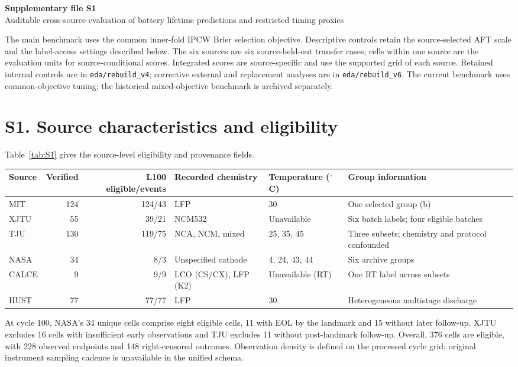 \documentclass[10pt,a4paper]{article}
\begin{document}
\raggedright
\begin{center}
{\Large\bfseries Supplementary file S1}\\[4pt]
Auditable cross-source evaluation of battery lifetime predictions and restricted timing proxies
\end{center}

The main benchmark uses the common inner-fold IPCW Brier selection objective. Descriptive controls retain the source-selected AFT scale and the label-access settings described below. The six sources are six source-held-out transfer cases; cells within one source are the evaluation units for source-conditional scores. Integrated scores are source-specific and use the supported grid of each source. Retained internal controls are in \texttt{eda/rebuild\_v4}; corrective external and replacement analyses are in \texttt{eda/rebuild\_v6}. The current benchmark uses common-objective tuning; the historical mixed-objective benchmark is archived separately.

\section*{S1. Source characteristics and eligibility}
Table~\ref{tab:S1} gives the source-level eligibility and provenance fields.
\begin{center}\small
\begin{minipage}{\linewidth}\centering
{}\label{tab:S1}
\begin{tabular}{lrrP{28mm}P{24mm}P{38mm}}
\toprule
Source & Verified & L100 eligible/events & Recorded chemistry & Temperature ($^\circ$C) & Group information \\\midrule
MIT &124&124/43&LFP&30&One selected group (b)\\
XJTU &55&39/21&NCM532&Unavailable&Six batch labels; four eligible batches\\
TJU &130&119/75&NCA, NCM, mixed&25, 35, 45&Three subsets; chemistry and protocol confounded\\
NASA &34&8/3&Unspecified cathode&4, 24, 43, 44&Six archive groups\\
CALCE &9&9/9&LCO (CS/CX), LFP (K2)&Unavailable (RT)&One RT label across subsets\\
HUST &77&77/77&LFP&30&Heterogeneous multistage discharge\\\bottomrule
\end{tabular}
\end{minipage}
\end{center}
At cycle 100, NASA's 34 unique cells comprise eight eligible cells, 11 with EOL by the landmark and 15 without later follow-up. XJTU excludes 16 cells with insufficient early observations and TJU excludes 11 without post-landmark follow-up. Overall, 376 cells are eligible, with 228 observed endpoints and 148 right-censored outcomes. Observation density is defined on the processed cycle grid; original instrument sampling cadence is unavailable in the unified schema.
\end{document}
